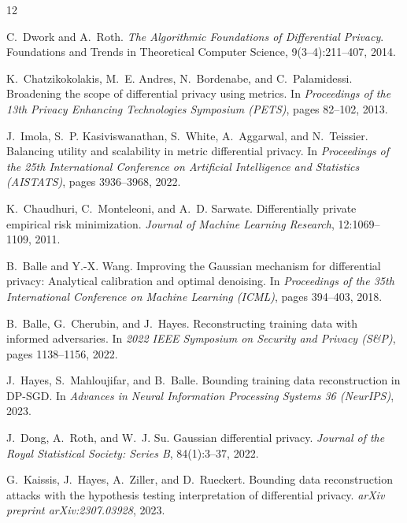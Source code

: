 \documentclass[11pt,a4paper]{report}
\theoremstyle{plain}
\theoremstyle{definition}
\theoremstyle{remark}
\begin{document}
\begin{thebibliography}{12}

C.~Dwork and A.~Roth.
\newblock \emph{The Algorithmic Foundations of Differential Privacy}.
\newblock Foundations and Trends in Theoretical Computer Science, 9(3--4):211--407, 2014.

K.~Chatzikokolakis, M.~E. Andres, N.~Bordenabe, and C.~Palamidessi.
\newblock Broadening the scope of differential privacy using metrics.
\newblock In \emph{Proceedings of the 13th Privacy Enhancing Technologies Symposium (PETS)}, pages 82--102, 2013.

J.~Imola, S.~P. Kasiviswanathan, S.~White, A.~Aggarwal, and N.~Teissier.
\newblock Balancing utility and scalability in metric differential privacy.
\newblock In \emph{Proceedings of the 25th International Conference on Artificial Intelligence and Statistics (AISTATS)}, pages 3936--3968, 2022.

K.~Chaudhuri, C.~Monteleoni, and A.~D. Sarwate.
\newblock Differentially private empirical risk minimization.
\newblock \emph{Journal of Machine Learning Research}, 12:1069--1109, 2011.

B.~Balle and Y.-X. Wang.
\newblock Improving the Gaussian mechanism for differential privacy: Analytical calibration and optimal denoising.
\newblock In \emph{Proceedings of the 35th International Conference on Machine Learning (ICML)}, pages 394--403, 2018.

B.~Balle, G.~Cherubin, and J.~Hayes.
\newblock Reconstructing training data with informed adversaries.
\newblock In \emph{2022 IEEE Symposium on Security and Privacy (S\&P)}, pages 1138--1156, 2022.

J.~Hayes, S.~Mahloujifar, and B.~Balle.
\newblock Bounding training data reconstruction in {DP-SGD}.
\newblock In \emph{Advances in Neural Information Processing Systems 36 (NeurIPS)}, 2023.

J.~Dong, A.~Roth, and W.~J. Su.
\newblock Gaussian differential privacy.
\newblock \emph{Journal of the Royal Statistical Society: Series B}, 84(1):3--37, 2022.

G.~Kaissis, J.~Hayes, A.~Ziller, and D.~Rueckert.
\newblock Bounding data reconstruction attacks with the hypothesis testing interpretation of differential privacy.
\newblock \emph{arXiv preprint arXiv:2307.03928}, 2023.


\end{thebibliography}
\end{document}

